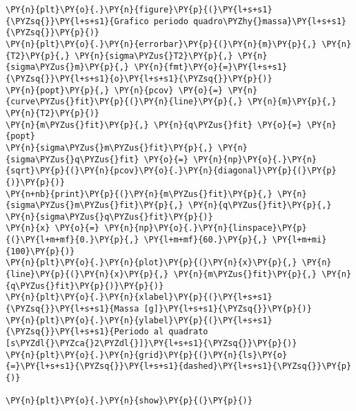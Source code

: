 \begin{Verbatim}[label=\makebox{\href{https://github.com/unipi-physics-labs/lab1-sheets/tree/main/snippy/misura_di_g.py}{https://github.com/.../misura\_di\_g.py}},commandchars=\\\{\}]
\PY{n}{plt}\PY{o}{.}\PY{n}{figure}\PY{p}{(}\PY{l+s+s1}{\PYZsq{}}\PY{l+s+s1}{Grafico periodo quadro\PYZhy{}massa}\PY{l+s+s1}{\PYZsq{}}\PY{p}{)}
\PY{n}{plt}\PY{o}{.}\PY{n}{errorbar}\PY{p}{(}\PY{n}{m}\PY{p}{,} \PY{n}{T2}\PY{p}{,} \PY{n}{sigma\PYZus{}T2}\PY{p}{,} \PY{n}{sigma\PYZus{}m}\PY{p}{,} \PY{n}{fmt}\PY{o}{=}\PY{l+s+s1}{\PYZsq{}}\PY{l+s+s1}{o}\PY{l+s+s1}{\PYZsq{}}\PY{p}{)}
\PY{n}{popt}\PY{p}{,} \PY{n}{pcov} \PY{o}{=} \PY{n}{curve\PYZus{}fit}\PY{p}{(}\PY{n}{line}\PY{p}{,} \PY{n}{m}\PY{p}{,} \PY{n}{T2}\PY{p}{)}
\PY{n}{m\PYZus{}fit}\PY{p}{,} \PY{n}{q\PYZus{}fit} \PY{o}{=} \PY{n}{popt}
\PY{n}{sigma\PYZus{}m\PYZus{}fit}\PY{p}{,} \PY{n}{sigma\PYZus{}q\PYZus{}fit} \PY{o}{=} \PY{n}{np}\PY{o}{.}\PY{n}{sqrt}\PY{p}{(}\PY{n}{pcov}\PY{o}{.}\PY{n}{diagonal}\PY{p}{(}\PY{p}{)}\PY{p}{)}
\PY{n+nb}{print}\PY{p}{(}\PY{n}{m\PYZus{}fit}\PY{p}{,} \PY{n}{sigma\PYZus{}m\PYZus{}fit}\PY{p}{,} \PY{n}{q\PYZus{}fit}\PY{p}{,} \PY{n}{sigma\PYZus{}q\PYZus{}fit}\PY{p}{)}
\PY{n}{x} \PY{o}{=} \PY{n}{np}\PY{o}{.}\PY{n}{linspace}\PY{p}{(}\PY{l+m+mf}{0.}\PY{p}{,} \PY{l+m+mf}{60.}\PY{p}{,} \PY{l+m+mi}{100}\PY{p}{)}
\PY{n}{plt}\PY{o}{.}\PY{n}{plot}\PY{p}{(}\PY{n}{x}\PY{p}{,} \PY{n}{line}\PY{p}{(}\PY{n}{x}\PY{p}{,} \PY{n}{m\PYZus{}fit}\PY{p}{,} \PY{n}{q\PYZus{}fit}\PY{p}{)}\PY{p}{)}
\PY{n}{plt}\PY{o}{.}\PY{n}{xlabel}\PY{p}{(}\PY{l+s+s1}{\PYZsq{}}\PY{l+s+s1}{Massa [g]}\PY{l+s+s1}{\PYZsq{}}\PY{p}{)}
\PY{n}{plt}\PY{o}{.}\PY{n}{ylabel}\PY{p}{(}\PY{l+s+s1}{\PYZsq{}}\PY{l+s+s1}{Periodo al quadrato [s\PYZdl{}\PYZca{}2\PYZdl{}]}\PY{l+s+s1}{\PYZsq{}}\PY{p}{)}
\PY{n}{plt}\PY{o}{.}\PY{n}{grid}\PY{p}{(}\PY{n}{ls}\PY{o}{=}\PY{l+s+s1}{\PYZsq{}}\PY{l+s+s1}{dashed}\PY{l+s+s1}{\PYZsq{}}\PY{p}{)}

\PY{n}{plt}\PY{o}{.}\PY{n}{show}\PY{p}{(}\PY{p}{)}
\end{Verbatim}
